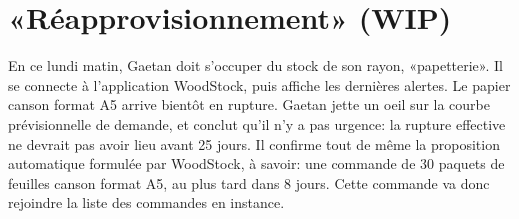 \section{«Réapprovisionnement» (WIP)}

En ce lundi matin, Gaetan doit s'occuper du stock de son rayon, «papetterie».
Il se connecte à l'application WoodStock, puis affiche les dernières alertes.
Le papier canson format A5 arrive bientôt en rupture.
Gaetan jette un oeil sur la courbe prévisionnelle de demande, et conclut qu'il n'y a pas urgence: la rupture effective ne devrait pas avoir lieu avant 25 jours.
Il confirme tout de même la proposition automatique formulée par WoodStock, à savoir: une commande de 30 paquets de feuilles canson format A5, au plus tard dans 8 jours.
Cette commande va donc rejoindre la liste des commandes en instance.
